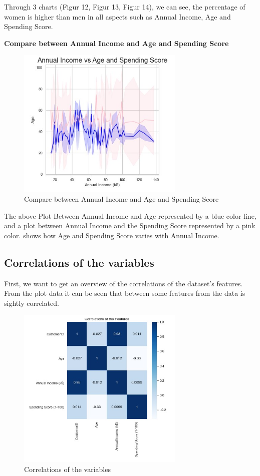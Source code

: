 \documentclass{article}
\begin{document}
\vspace{2cm}

Through 3 charts (Figur 12, Figur 13, Figur 14), we can see, the percentage of women is higher than men in all aspects such as Annual Income, Age and Spending Score. 

\vspace{2cm}
\textbf{Compare between Annual Income and Age and Spending Score}
\begin{figure}[htp]
    \centering
    \includegraphics[width=8cm]{Compare.jpg}
    \caption{Compare between Annual Income and Age and Spending Score}
    \label{fig:Compare between Annual Income and Age and Spending Score}
\end{figure}

The above Plot Between Annual Income and Age represented by a blue color line, and a plot between Annual Income and the Spending Score represented by a pink color. shows how Age and Spending Score varies with Annual Income.

\subsection{Correlations of the variables}

First, we want to get an overview of the correlations of the dataset's features. From the plot data it can be seen that between some features from the data is sightly correlated.

\begin{figure}[htp]
    \centering
    \includegraphics[width=8cm]{Corellation.jpg}
    \caption{Correlations of the variables}
    \label{fig:Correlations of the variables}
\end{figure}
\vspace{5cm}
\end{document}
